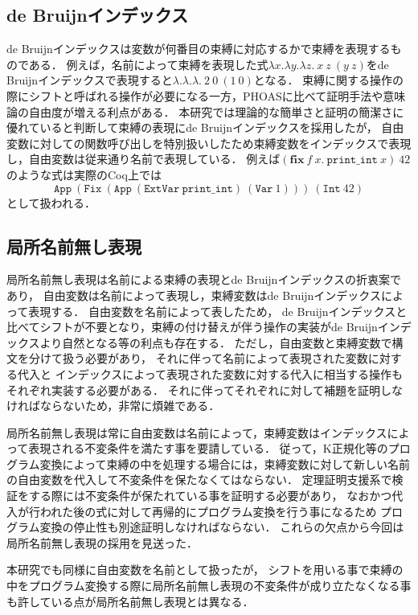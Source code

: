 \documentclass[T]{compsoft}
\newcommand{\keyword}[1]{\mathbf{#1}}
\newcommand{\FIX}{\keyword{fix}}
\begin{document}
\subsection{de Bruijnインデックス}
de Bruijnインデックスは変数が何番目の束縛に対応するかで束縛を表現するものである．
例えば，名前によって束縛を表現した式$\lambda x. \lambda y. \lambda z.~x~z~(y~z)$をde Bruijnインデックスで表現すると$\lambda. \lambda. \lambda.~2~0~(1~0)$となる．
束縛に関する操作の際にシフトと呼ばれる操作が必要になる一方，PHOASに比べて証明手法や意味論の自由度が増える利点がある．
本研究では理論的な簡単さと証明の簡潔さに優れていると判断して束縛の表現にde Bruijnインデックスを採用したが，
自由変数に対しての関数呼び出しを特別扱いしたため束縛変数をインデックスで表現し，自由変数は従来通り名前で表現している．
例えば$(\FIX~f~x.~\texttt{print\_int}~x)~42$のような式は実際のCoq上では
\[\texttt{App}~(\texttt{Fix}~(\texttt{App}~(\texttt{ExtVar}~\texttt{print\_int})~(\texttt{Var}~1)))~(\texttt{Int}~42)\]
として扱われる．

\subsection{局所名前無し表現}
局所名前無し表現は名前による束縛の表現とde Bruijnインデックスの折衷案であり，
自由変数は名前によって表現し，束縛変数はde Bruijnインデックスによって表現する．
自由変数を名前によって表したため，
de Bruijnインデックスと比べてシフトが不要となり，束縛の付け替えが伴う操作の実装がde Bruijnインデックスより自然となる等の利点も存在する．
ただし，自由変数と束縛変数で構文を分けて扱う必要があり，
それに伴って名前によって表現された変数に対する代入と
インデックスによって表現された変数に対する代入に相当する操作もそれぞれ実装する必要がある．
それに伴ってそれぞれに対して補題を証明しなければならないため，非常に煩雑である．

局所名前無し表現は常に自由変数は名前によって，束縛変数はインデックスによって表現される不変条件を満たす事を要請している．
従って，K正規化等のプログラム変換によって束縛の中を処理する場合には，束縛変数に対して新しい名前の自由変数を代入して不変条件を保たなくてはならない．
定理証明支援系で検証をする際には不変条件が保たれている事を証明する必要があり，
なおかつ代入が行われた後の式に対して再帰的にプログラム変換を行う事になるため
プログラム変換の停止性も別途証明しなければならない．
これらの欠点から今回は局所名前無し表現の採用を見送った．

本研究でも同様に自由変数を名前として扱ったが，
シフトを用いる事で束縛の中をプログラム変換する際に局所名前無し表現の不変条件が成り立たなくなる事も許している点が局所名前無し表現とは異なる．
\end{document}
